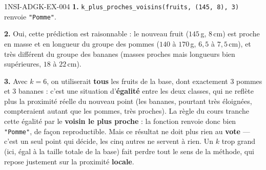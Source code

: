 \begin{corrige}{1NSI-ADGK-EX-004}
\textbf{1.} \lstinline{k_plus_proches_voisins(fruits, (145, 8), 3)} renvoie
\lstinline{"Pomme"}.

\textbf{2.} Oui, cette prédiction est raisonnable : le nouveau fruit ($145$\,g,
$8$\,cm) est proche en masse et en longueur du groupe des pommes ($140$ à $170$\,g,
$6{,}5$ à $7{,}5$\,cm), et très différent du groupe des bananes (masses proches mais
longueurs bien supérieures, $18$ à $22$\,cm).

\textbf{3.} Avec $k=6$, on utiliserait \textbf{tous} les fruits de la base, dont exactement
$3$ pommes et $3$ bananes : c'est une situation d'\textbf{égalité} entre les deux classes,
qui ne reflète plus la proximité réelle du nouveau point (les bananes, pourtant très
éloignées, compteraient autant que les pommes, très proches). La règle du cours tranche
cette égalité par le \textbf{voisin le plus proche} : la fonction renvoie donc bien
\lstinline{"Pomme"}, de façon reproductible. Mais ce résultat ne doit plus rien au
\textbf{vote} — c'est un seul point qui décide, les cinq autres ne servent à rien. Un
$k$ trop grand (ici, égal à la taille totale de la base) fait perdre tout le sens de la
méthode, qui repose justement sur la proximité \textbf{locale}.
\end{corrige}
